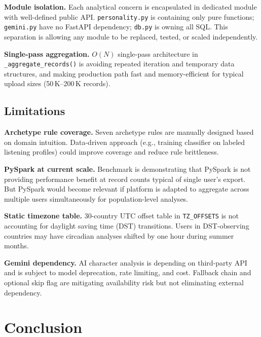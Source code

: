 \documentclass[conference]{IEEEtran}
\begin{document}
\textbf{Module isolation.} Each analytical concern is encapsulated in dedicated module with well-defined public API. \texttt{personality.py} is containing only pure functions; \texttt{gemini.py} have no FastAPI dependency; \texttt{db.py} is owning all SQL. This separation is allowing any module to be replaced, tested, or scaled independently.

\textbf{Single-pass aggregation.} $O(N)$ single-pass architecture in \texttt{\_aggregate\_records()} is avoiding repeated iteration and temporary data structures, and making production path fast and memory-efficient for typical upload sizes (50\,K--200\,K records).

\subsection{Limitations}

\textbf{Archetype rule coverage.} Seven archetype rules are manually designed based on domain intuition. Data-driven approach (e.g., training classifier on labeled listening profiles) could improve coverage and reduce rule brittleness.

\textbf{PySpark at current scale.} Benchmark is demonstrating that PySpark is not providing performance benefit at record counts typical of single user's export. But PySpark would become relevant if platform is adapted to aggregate across multiple users simultaneously for population-level analyses.

\textbf{Static timezone table.} 30-country UTC offset table in \texttt{TZ\_OFFSETS} is not accounting for daylight saving time (DST) transitions. Users in DST-observing countries may have circadian analyses shifted by one hour during summer months.

\textbf{Gemini dependency.} AI character analysis is depending on third-party API and is subject to model deprecation, rate limiting, and cost. Fallback chain and optional skip flag are mitigating availability risk but not eliminating external dependency.

\section{Conclusion}
\end{document}
